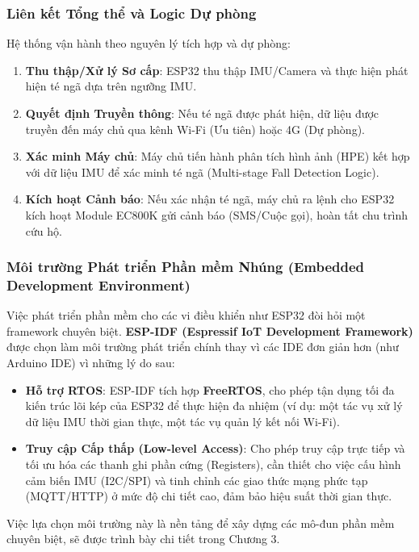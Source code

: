 \subsubsection{Liên kết Tổng thể và Logic Dự phòng}
Hệ thống vận hành theo nguyên lý tích hợp và dự phòng:
\begin{enumerate}
    \item \textbf{Thu thập/Xử lý Sơ cấp}: ESP32 thu thập IMU/Camera và thực hiện phát hiện té ngã dựa trên ngưỡng IMU.
    \item \textbf{Quyết định Truyền thông}: Nếu té ngã được phát hiện, dữ liệu được truyền đến máy chủ qua kênh Wi-Fi (Ưu tiên) hoặc 4G (Dự phòng).
    \item \textbf{Xác minh Máy chủ}: Máy chủ tiến hành phân tích hình ảnh (HPE) kết hợp với dữ liệu IMU để xác minh té ngã (Multi-stage Fall Detection Logic).
    \item \textbf{Kích hoạt Cảnh báo}: Nếu xác nhận té ngã, máy chủ ra lệnh cho ESP32 kích hoạt Module EC800K gửi cảnh báo (SMS/Cuộc gọi), hoàn tất chu trình cứu hộ.
\end{enumerate}

\subsubsection{Môi trường Phát triển Phần mềm Nhúng (Embedded Development Environment)}
Việc phát triển phần mềm cho các vi điều khiển như ESP32 đòi hỏi một framework chuyên biệt. \textbf{ESP-IDF (Espressif IoT Development Framework)} được chọn làm môi trường phát triển chính thay vì các IDE đơn giản hơn (như Arduino IDE) vì những lý do sau:
\begin{itemize}
    \item \textbf{Hỗ trợ RTOS}: ESP-IDF tích hợp \textbf{FreeRTOS}, cho phép tận dụng tối đa kiến trúc lõi kép của ESP32 để thực hiện đa nhiệm (ví dụ: một tác vụ xử lý dữ liệu IMU thời gian thực, một tác vụ quản lý kết nối Wi-Fi).
    \item \textbf{Truy cập Cấp thấp (Low-level Access)}: Cho phép truy cập trực tiếp và tối ưu hóa các thanh ghi phần cứng (Registers), cần thiết cho việc cấu hình cảm biến IMU (I2C/SPI) và tinh chỉnh các giao thức mạng phức tạp (MQTT/HTTP) ở mức độ chi tiết cao, đảm bảo hiệu suất thời gian thực.
\end{itemize}
Việc lựa chọn môi trường này là nền tảng để xây dựng các mô-đun phần mềm chuyên biệt, sẽ được trình bày chi tiết trong Chương 3.
